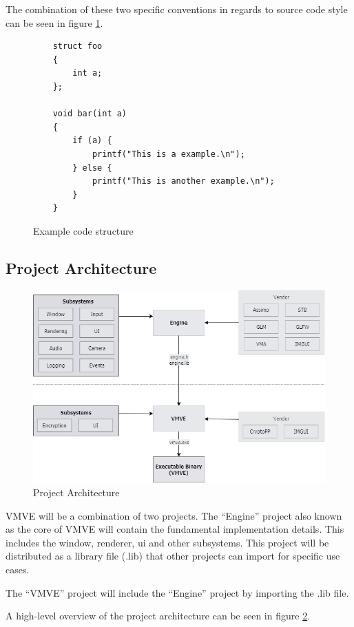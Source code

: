 \documentclass[11pt]{article}
\begin{document}
The combination of these two specific conventions in regards to source
code style can be seen in figure \ref{fig:convention}.
\begin{figure}[h!]
  \begin{verbatim}
    struct foo
    {
        int a;
    };

    void bar(int a)
    {
        if (a) {
            printf("This is a example.\n");
        } else {
            printf("This is another example.\n");
        }
    }
  \end{verbatim}
  \caption{Example code structure}
  \label{fig:convention}
\end{figure}



\subsection{Project Architecture}

\begin{figure}[h!]
  \centering
  \includegraphics[width=\textwidth]{images/project_architecture.png}
  \caption{Project Architecture}
  \label{fig:projarch}
\end{figure}
VMVE will be a combination of two projects. The ``Engine'' project
also known as the core of VMVE will contain the fundamental
implementation details. This includes the window, renderer, ui and
other subsystems. This project will be distributed as a library
file (.lib) that other projects can import for specific use cases.

The ``VMVE'' project will include the ``Engine'' project by importing
the .lib file.

A high-level overview of the project architecture can be seen in
figure \ref{fig:projarch}.
\end{document}
